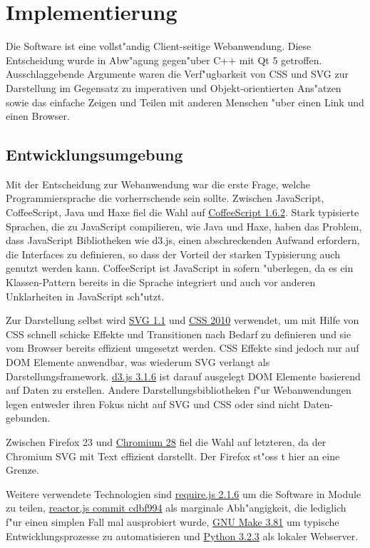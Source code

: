 \section{Implementierung}

Die Software ist eine vollst"andig Client-seitige Webanwendung. Diese
Entscheidung wurde in Abw"agung gegen"uber C++ mit Qt 5 getroffen.
Ausschlaggebende Argumente waren die Verf"ugbarkeit von CSS und SVG zur
Darstellung im Gegensatz zu imperativen und Objekt-orientierten Ans"atzen
sowie das einfache Zeigen und Teilen mit anderen Menschen "uber einen
Link und einen Browser.

\subsection{Entwicklungsumgebung}

Mit der Entscheidung zur Webanwendung war die erste Frage, welche
Programmiersprache die vorherrschende sein sollte. Zwischen JavaScript,
CoffeeScript, Java und Haxe fiel die Wahl auf
\href{http://coffeescript.org/}{CoffeeScript 1.6.2}. Stark typisierte
Sprachen, die zu JavaScript compilieren, wie Java und Haxe, haben das
Problem, dass JavaScript Bibliotheken wie d3.js, einen abschreckenden
Aufwand erfordern, die Interfaces zu definieren, so dass der Vorteil der
starken Typisierung auch genutzt werden kann. CoffeeScript ist
JavaScript in sofern "uberlegen, da es ein Klassen-Pattern bereits in die
Sprache integriert und auch vor anderen Unklarheiten in JavaScript
sch"utzt.

Zur Darstellung selbst wird \href{http://www.w3.org/TR/SVG11/}{SVG 1.1}
und \href{http://www.w3.org/TR/css-2010/}{CSS 2010} verwendet, um mit
Hilfe von CSS schnell schicke Effekte und Transitionen nach Bedarf zu
definieren und sie vom Browser bereits effizient umgesetzt werden. CSS
Effekte sind jedoch nur auf DOM Elemente anwendbar, was wiederum SVG
verlangt als Darstellungsframework. \href{http://d3js.org/}{d3.js 3.1.6}
ist darauf ausgelegt DOM Elemente basierend auf Daten zu erstellen.
Andere Darstellungsbibliotheken f"ur Webanwendungen legen entweder ihren
Fokus nicht auf SVG und CSS oder sind nicht Daten-gebunden.

Zwischen Firefox 23 und \href{http://www.chromium.org/Home}{Chromium 28}
fiel die Wahl auf letzteren, da der Chromium SVG mit Text effizient
darstellt. Der Firefox st"oss t hier an eine Grenze.

Weitere verwendete Technologien sind
\href{http://requirejs.org/}{require.js 2.1.6} um die Software in Module
zu teilen, \href{https://github.com/fynyky/reactor.js}{reactor.js commit
cdbf994} als marginale Abh"angigkeit, die lediglich f"ur einen simplen
Fall mal ausprobiert wurde,
\href{https://www.gnu.org/software/make/}{GNU Make 3.81} um typische
Entwicklungsprozesse zu automatisieren und
\href{http://python.org/}{Python 3.2.3} als lokaler Webserver.

